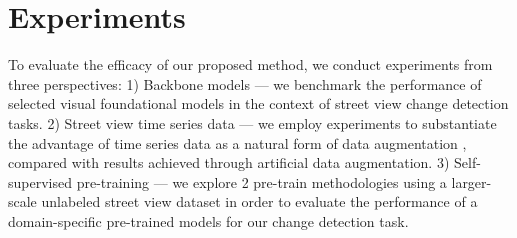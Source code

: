 \documentclass[letterpaper]{article} %
\begin{document}
\section{Experiments}
To evaluate the efficacy of our proposed method, we conduct experiments from three perspectives: 1) Backbone models --- we benchmark the performance of selected visual foundational models in the context of street view change detection tasks. 2) Street view time series data --- we employ experiments to substantiate the advantage of time series data as a natural form of data augmentation \cite{seco}, compared with results achieved through artificial data augmentation. 3) Self-supervised pre-training --- we explore 2 pre-train methodologies using a larger-scale unlabeled street view dataset in order to evaluate the performance of a domain-specific pre-trained models for our change detection task.
\end{document}
